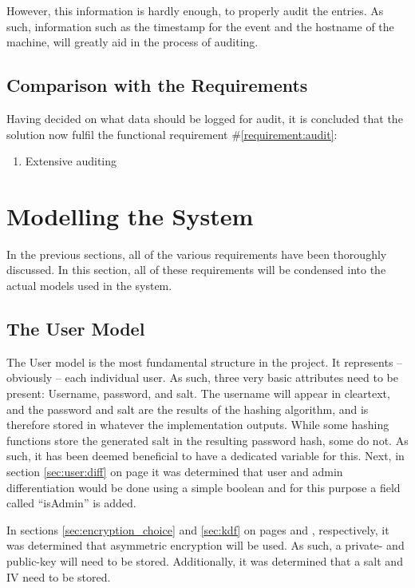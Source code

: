 		However, this information is hardly enough, to properly audit the entries. As such, information such as the timestamp for the event and the hostname of the machine, will greatly aid in the process of auditing. 

		\subsection{Comparison with the Requirements}
			\label{requirement:fulfilled:audit}
			Having decided on what data should be logged for audit, it is concluded that the solution now fulfil the functional requirement \#\ref{requirement:audit}:
			\vspace{-3ex}\begin{enumerate}
				\setlength\itemsep{0.1em}
				\setcounter{enumi}{13-1}
				\item Extensive auditing
			\end{enumerate}

	\section{Modelling the System}
		\label{sec:modelling}
		In the previous sections, all of the various requirements have been thoroughly discussed. In this section, all of these requirements will be condensed into the actual models used in the system. 

		\subsection{The User Model}
			The User model is the most fundamental structure in the project. It represents -- obviously -- each individual user. As such, three very basic attributes need to be present: Username, password, and salt. The username will appear in cleartext, and the password and salt are the results of the hashing algorithm, and is therefore stored in whatever the implementation outputs. While some hashing functions store the generated salt in the resulting password hash, some do not. As such, it has been deemed beneficial to have a dedicated variable for this. Next, in section \ref{sec:user:diff} on page \pageref{sec:user:diff} it was determined that user and admin differentiation would be done using a simple boolean and for this purpose a field called ``isAdmin'' is added.

			In sections \ref{sec:encryption_choice} and \ref{sec:kdf} on pages \pageref{sec:encryption_choice} and \pageref{sec:kdf}, respectively, it was determined that asymmetric encryption will be used. As such, a private- and public-key will need to be stored. Additionally, it was determined that a salt and IV need to be stored. 

